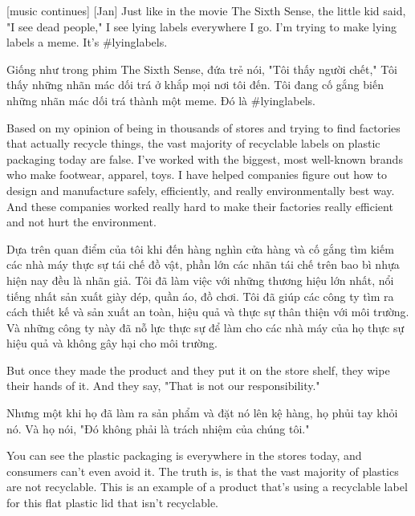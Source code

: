 \documentclass[a4paper]{article}
\begin{document}
	[music continues]
	[Jan] Just like in the movie The Sixth Sense, the little kid said, "I see dead people,"
	I see lying labels everywhere I go.
	I'm trying to make lying labels a meme.
	It's \#lyinglabels.
	
	\begin{vietnamese-v2}
		 Giống như trong phim The Sixth Sense, đứa trẻ nói, "Tôi thấy người chết,"
		Tôi thấy những nhãn mác dối trá ở khắp mọi nơi tôi đến.
		Tôi đang cố gắng biến những nhãn mác dối trá thành một meme.
		Đó là \#lyinglabels.
	\end{vietnamese-v2}
	
	Based on my opinion of being in thousands of stores and trying to find factories that actually recycle things, the vast majority of recyclable labels on plastic packaging today are false.
	I've worked with the biggest, most well-known brands who make footwear, apparel, toys.
	I have helped companies figure out how to design and manufacture safely, efficiently, and really environmentally best way.
	And these companies worked really hard to make their factories really efficient and not hurt the environment.
	
	\begin{vietnamese-v2}
		Dựa trên quan điểm của tôi khi đến hàng nghìn cửa hàng và cố gắng tìm kiếm các nhà máy thực sự tái chế đồ vật, phần lớn các nhãn tái chế trên bao bì nhựa hiện nay đều là nhãn giả.
		Tôi đã làm việc với những thương hiệu lớn nhất, nổi tiếng nhất sản xuất giày dép, quần áo, đồ chơi.
		Tôi đã giúp các công ty tìm ra cách thiết kế và sản xuất an toàn, hiệu quả và thực sự thân thiện với môi trường.
		Và những công ty này đã nỗ lực thực sự để làm cho các nhà máy của họ thực sự hiệu quả và không gây hại cho môi trường.
	\end{vietnamese-v2}
	
	But once they made the product and they put it on the store shelf, they wipe their hands of it.
	And they say, "That is not our responsibility."
	
	\begin{vietnamese-v2}
		Nhưng một khi họ đã làm ra sản phẩm và đặt nó lên kệ hàng, họ phủi tay khỏi nó.
		Và họ nói, "Đó không phải là trách nhiệm của chúng tôi."
	\end{vietnamese-v2}
	
	You can see the plastic packaging is everywhere in the stores today, and consumers can't even avoid it.
	The truth is, is that the vast majority of plastics are not recyclable.
	This is an example of a product that's using a recyclable label for this flat plastic lid that isn't recyclable.
	
\end{document}
